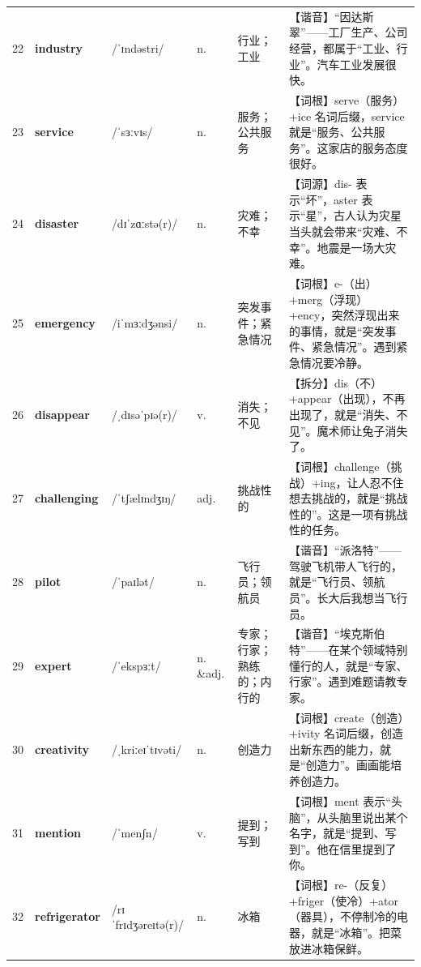 \documentclass[UTF8,a4paper,11pt,oneside]{ctexbook}
\newcommand{\cellword}[1]{{\bfseries\textcolor{wordcol}{#1}}}
\newcommand{\cellipa}[1]{{\footnotesize\textcolor{ipacol}{#1}}}
\newcommand{\cellpos}[1]{\textcolor{poscol}{#1}}
\newcommand{\cellno}[1]{\textcolor{volcolor!75!black}{#1}}
\begin{document}
{\begin{longtable}{@{}C{0.045\textwidth}L{0.155\textwidth}L{0.175\textwidth}C{0.070\textwidth}L{0.180\textwidth}L{0.282\textwidth}@{}}
\cellno{22} & \cellword{industry} & \cellipa{/ˈɪndəstri/} & \cellpos{n.} & 行业；工业 & \textcolor{tagSound}{【谐音】}“因达斯翠”——工厂生产、公司经营，都属于“工业、行业”。汽车工业发展很快。 \\
 \cellno{23} & \cellword{service} & \cellipa{/ˈsɜːvɪs/} & \cellpos{n.} & 服务；公共服务 & \textcolor{tagRoot}{【词根】}serve（服务）+ice 名词后缀，service 就是“服务、公共服务”。这家店的服务态度很好。 \\
\cellno{24} & \cellword{disaster} & \cellipa{/dɪˈzɑːstə(r)/} & \cellpos{n.} & 灾难；不幸 & \textcolor{tagEtym}{【词源】}dis- 表示“坏”，aster 表示“星”，古人认为灾星当头就会带来“灾难、不幸”。地震是一场大灾难。 \\
 \cellno{25} & \cellword{emergency} & \cellipa{/iˈmɜːdʒənsi/} & \cellpos{n.} & 突发事件；紧急情况 & \textcolor{tagRoot}{【词根】}e-（出）+merg（浮现）+ency，突然浮现出来的事情，就是“突发事件、紧急情况”。遇到紧急情况要冷静。 \\
\cellno{26} & \cellword{disappear} & \cellipa{/ˌdɪsəˈpɪə(r)/} & \cellpos{v.} & 消失；不见 & \textcolor{tagSplit}{【拆分】}dis（不）+appear（出现），不再出现了，就是“消失、不见”。魔术师让兔子消失了。 \\
 \cellno{27} & \cellword{challenging} & \cellipa{/ˈtʃælɪndʒɪŋ/} & \cellpos{adj.} & 挑战性的 & \textcolor{tagRoot}{【词根】}challenge（挑战）+ing，让人忍不住想去挑战的，就是“挑战性的”。这是一项有挑战性的任务。 \\
\cellno{28} & \cellword{pilot} & \cellipa{/ˈpaɪlət/} & \cellpos{n.} & 飞行员；领航员 & \textcolor{tagSound}{【谐音】}“派洛特”——驾驶飞机带人飞行的，就是“飞行员、领航员”。长大后我想当飞行员。 \\
 \cellno{29} & \cellword{expert} & \cellipa{/ˈekspɜːt/} & \cellpos{n. \&adj.} & 专家；行家；熟练的；内行的 & \textcolor{tagSound}{【谐音】}“埃克斯伯特”——在某个领域特别懂行的人，就是“专家、行家”。遇到难题请教专家。 \\
\cellno{30} & \cellword{creativity} & \cellipa{/ˌkriːeɪˈtɪvəti/} & \cellpos{n.} & 创造力 & \textcolor{tagRoot}{【词根】}create（创造）+ivity 名词后缀，创造出新东西的能力，就是“创造力”。画画能培养创造力。 \\
 \cellno{31} & \cellword{mention} & \cellipa{/ˈmenʃn/} & \cellpos{v.} & 提到；写到 & \textcolor{tagRoot}{【词根】}ment 表示“头脑”，从头脑里说出某个名字，就是“提到、写到”。他在信里提到了你。 \\
\cellno{32} & \cellword{refrigerator} & \cellipa{/rɪˈfrɪdʒəreɪtə(r)/} & \cellpos{n.} & 冰箱 & \textcolor{tagRoot}{【词根】}re-（反复）+friger（使冷）+ator（器具），不停制冷的电器，就是“冰箱”。把菜放进冰箱保鲜。 \\

\end{longtable}}
\end{document}
